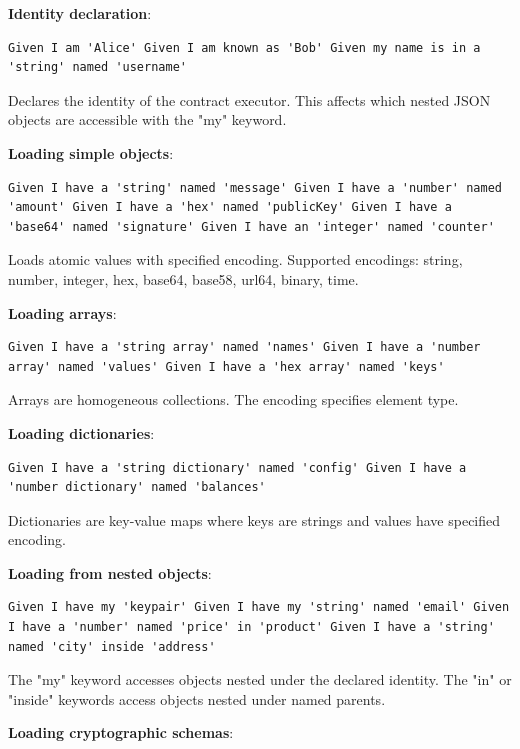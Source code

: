 \textbf{Identity declaration}:

\begin{verbatim}
Given I am 'Alice' Given I am known as 'Bob' Given my name is in a
'string' named 'username'
\end{verbatim}

Declares the identity of the contract executor. This affects which
nested JSON objects are accessible with the "my" keyword.

\textbf{Loading simple objects}:

\begin{verbatim}
Given I have a 'string' named 'message' Given I have a 'number' named
'amount' Given I have a 'hex' named 'publicKey' Given I have a
'base64' named 'signature' Given I have an 'integer' named 'counter'
\end{verbatim}

Loads atomic values with specified encoding. Supported encodings:
string, number, integer, hex, base64, base58, url64, binary, time.

\textbf{Loading arrays}:

\begin{verbatim}
Given I have a 'string array' named 'names' Given I have a 'number
array' named 'values' Given I have a 'hex array' named 'keys'
\end{verbatim}

Arrays are homogeneous collections. The encoding specifies element
type.

\textbf{Loading dictionaries}:

\begin{verbatim}
Given I have a 'string dictionary' named 'config' Given I have a
'number dictionary' named 'balances'
\end{verbatim}

Dictionaries are key-value maps where keys are strings and values have
specified encoding.

\textbf{Loading from nested objects}:

\begin{verbatim}
Given I have my 'keypair' Given I have my 'string' named 'email' Given
I have a 'number' named 'price' in 'product' Given I have a 'string'
named 'city' inside 'address'
\end{verbatim}

The "my" keyword accesses objects nested under the declared
identity. The "in" or "inside" keywords access objects nested under
named parents.

\textbf{Loading cryptographic schemas}:

